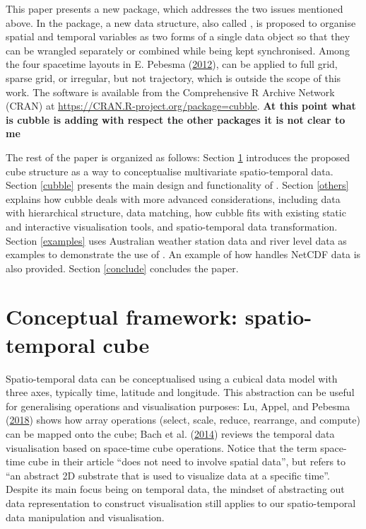 \documentclass{article}
\begin{document}
This paper presents a new  package,  which addresses the two issues mentioned above. In the package, a new data structure, also called , is proposed to organise spatial and temporal variables as two forms of a single data object so that they can be wrangled separately or combined while being kept synchronised. Among the four spacetime layouts in E. Pebesma (\protect\hyperlink{ref-spacetime}{2012}),  can be applied to full grid, sparse grid, or irregular, but not trajectory, which is outside the scope of this work. The software is available from the Comprehensive R Archive Network (CRAN) at \url{https://CRAN.R-project.org/package=cubble}. \textbf{At this point what is cubble is adding with respect the other packages it is not clear to me}

The rest of the paper is organized as follows: Section \ref{cube} introduces the proposed cube structure as a way to conceptualise multivariate spatio-temporal data. Section \ref{cubble} presents the main design and functionality of . Section \ref{others} explains how cubble deals with more advanced considerations, including data with hierarchical structure, data matching, how cubble fits with existing static and interactive visualisation tools, and spatio-temporal data transformation. Section \ref{examples} uses Australian weather station data and river level data as examples to demonstrate the use of . An example of how  handles NetCDF data is also provided. Section \ref{conclude} concludes the paper.

\hypertarget{cube}{%
\section{Conceptual framework: spatio-temporal cube}\label{cube}}

Spatio-temporal data can be conceptualised using a cubical data model with three axes, typically time, latitude and longitude. This abstraction can be useful for generalising operations and visualisation purposes: Lu, Appel, and Pebesma (\protect\hyperlink{ref-lu_multidimensional_2018}{2018}) shows how array operations (select, scale, reduce, rearrange, and compute) can be mapped onto the cube; Bach et al. (\protect\hyperlink{ref-bach_review_2014}{2014}) reviews the temporal data visualisation based on space-time cube operations. Notice that the term space-time cube in their article ``does not need to involve spatial data'', but refers to ``an abstract 2D substrate that is used to visualize data at a specific time''. Despite its main focus being on temporal data, the mindset of abstracting out data representation to construct visualisation still applies to our spatio-temporal data manipulation and visualisation.
\end{document}
